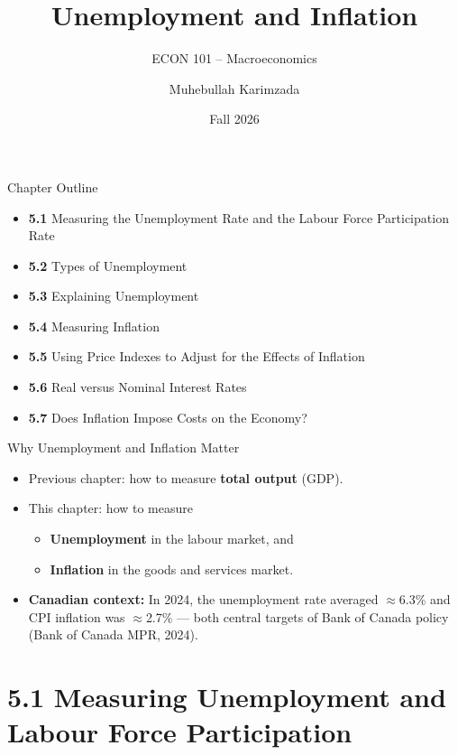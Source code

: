 \documentclass[aspectratio=169]{beamer}
\title{\textbf{Unemployment and Inflation}}
\subtitle{{\large ECON 101 -- Macroeconomics}}
\author{Muhebullah Karimzada}
\date{Fall 2026}
\begin{document}

\begin{frame}[plain]
  \titlepage
\end{frame}

\begin{frame}{Chapter Outline}
\transfade
\begin{itemize}
  \item \textbf{5.1} Measuring the Unemployment Rate and the Labour Force Participation Rate
  \item \textbf{5.2} Types of Unemployment
  \item \textbf{5.3} Explaining Unemployment
  \item \textbf{5.4} Measuring Inflation
  \item \textbf{5.5} Using Price Indexes to Adjust for the Effects of Inflation
  \item \textbf{5.6} Real versus Nominal Interest Rates
  \item \textbf{5.7} Does Inflation Impose Costs on the Economy?
\end{itemize}
\end{frame}

\begin{frame}{Why Unemployment and Inflation Matter}
\transfade
\begin{itemize}
  \item Previous chapter: how to measure \textbf{total output} (GDP).
  \item This chapter: how to measure
  \begin{itemize}
    \item \textbf{Unemployment} in the labour market, and
    \item \textbf{Inflation} in the goods and services market.
  \end{itemize}
  \item \textbf{Canadian context:} In 2024, the unemployment rate averaged $\approx$6.3\% and CPI inflation was $\approx$2.7\% --- both central targets of Bank of Canada policy (Bank of Canada MPR, 2024).
\end{itemize}
\end{frame}

\section{5.1 Measuring Unemployment and Labour Force Participation}
\end{document}
